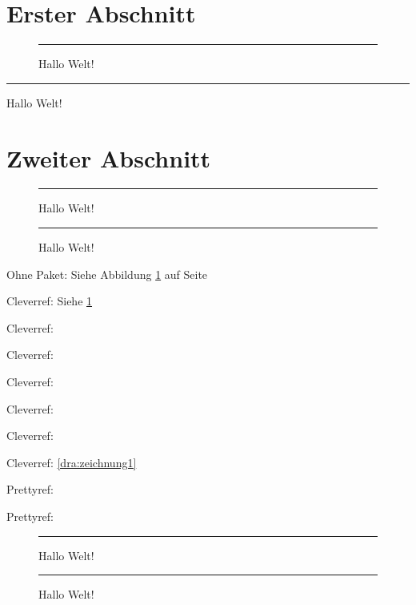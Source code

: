 \documentclass[ngerman]{scrartcl}
\begin{document}
\listoftodos

\label{aaa}

\section{Erster Abschnitt}\label{sec:erst}
 
\blindtext[1] 
 
 
\blindtext[1] 
 
\begin{figure}[h]%
\rule{\columnwidth}{5cm}
\caption{Hallo Welt!}%
\label{fig:test1}%
\end{figure}
\clearpage
 
\begin{table}[h]%
\rule{\columnwidth}{5cm}
\caption{Hallo Welt!}%
\label{dra:zeichnung1}%
\end{table}
 
 
\blindtext[1]
 
\section{Zweiter Abschnitt}
 
\blindtext[1]
 
\begin{figure}[h]%
\rule{\columnwidth}{5cm}
\caption{Hallo Welt!}%
\label{fig:test2}%
\end{figure}
 
\blindtext[1]\vspace*{1em}
 
\begin{figure}%
\rule{\columnwidth}{5cm}
\caption{Hallo Welt!}%
\label{fig:hier}%
\end{figure}
 
\begin{compactitem}
	\item Ohne Paket: Siehe Abbildung \ref{fig:test1} auf Seite \pageref{fig:test1} \vspace*{1em}
	\item Cleverref: Siehe \cref{fig:test1}
	\item Cleverref:  
	\item Cleverref:  
	\item Cleverref: 
	\item Cleverref:  %
	\item Cleverref:  
	\item Cleverref: \cref{dra:zeichnung1}\vspace*{1em} 
	\item Prettyref: 
	\item Prettyref: 
	
\end{compactitem}


 
\clearpage 
 
\begin{figure}%
\rule{\columnwidth}{5cm}
\caption{Hallo Welt!}%
\label{fig:test3}%
\end{figure}
 
\clearpage 
 
\begin{figure}%
\rule{\columnwidth}{5cm}
\caption{Hallo Welt!}%
\label{fig:test4}%
\end{figure}
 
\end{document}
